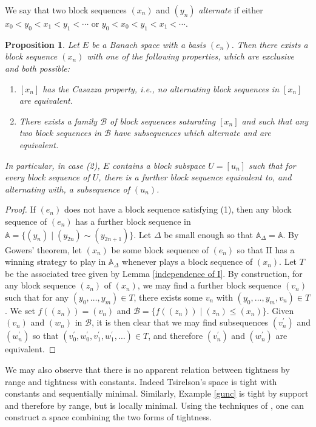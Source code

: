\documentclass[10pt]{amsart}
\numberwithin{equation}{section}
\newtheorem{prop} [thm] {Proposition}
\begin{document}
We say that two block sequences $(x_n)$ and $(y_n)$  {\em alternate} if either $x_0<y_0<x_1<y_1<\cdots$ or $y_0<x_0<y_1<x_1<\cdots$.
\begin{prop}

Let $E$ be a Banach space with a basis $(e_n)$. Then there exists a block
sequence $(x_n)$ with one of the following properties, which are exclusive and
both possible:
\begin{enumerate}
  \item $[x_n]$ has the Casazza property, i.e., no alternating block sequences in $[x_n]$ are equivalent.
  \item There exists a family ${\mathcal B}$ of block sequences saturating $[x_n]$
  and such that any two block sequences in ${\mathcal B}$ have subsequences
  which alternate and are equivalent.
\end{enumerate}
In particular, in case (2), $E$ contains a block subspace $U=[u_n]$ such that
for every block sequence  of $U$, there is a further block sequence equivalent
to, and alternating with, a subsequence of $(u_n)$.
\end{prop}

\begin{proof}
If $(e_n)$ does not have a block sequence satisfying (1), then any block sequence
of $(e_n)$ has a further block sequence in
${\mathbb A}=\{(y_n){ \; \big| \;} (y_{2n}) \sim (y_{2n+1})\}$. Let $\Delta$ be small enough so that
${\mathbb A}_{\Delta}={\mathbb A}$. By Gowers' theorem, let $(x_n)$ be some block sequence of
$(e_n)$ so that II has a winning strategy to play in ${\mathbb A}_{\Delta}$ whenever
plays a block sequence of $(x_n)$. Let $T$ be the associated tree given by
Lemma \ref{independence of I}. By construction, for any block sequence $(z_n)$
of $(x_n)$, we may find a further block sequence $(v_n)$ such that for any
$(y_0,\ldots,y_m) \in T$, there exists some $v_n$ with
$(y_0,\ldots,y_m,v_n) \in T$. We set $f((z_n))=(v_n)$ and
${\mathcal B}=\{f((z_n)){ \; \big| \;} (z_n) {\ensuremath{\leqslant}} (x_n)\}$.
Given $(v_n)$ and $(w_n)$ in ${\mathcal B}$, it is then clear that we may find
subsequences $(v^{\prime}_n)$ and $(w^{\prime}_n)$ so that
$(v_0^{\prime},w_0^{\prime},v_1^{\prime},w_1^{\prime},\ldots) \in T$, and
therefore $(v_n^{\prime})$ and $(w_n^{\prime})$ are equivalent.
\end{proof}

We may also observe that there is no apparent relation between tightness by
range and tightness with constants. Indeed Tsirelson's space is tight with
constants and sequentially minimal. Similarly, Example \ref{gunc} is tight by
support and therefore by range, but is locally minimal. Using the techniques of
\cite{ADKM}, one can construct a space combining the two forms of tightness.
\end{document}
